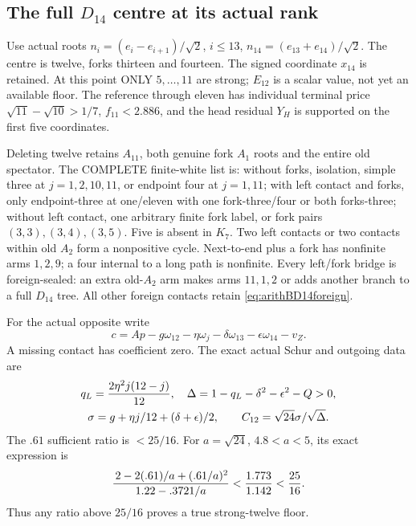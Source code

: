 \subsection{The full \(D_{14}\) centre at its actual rank}
\label{app:arithD14typedcentre}

Use actual roots
\(n_i=(e_i-e_{i+1})/\sqrt2\), \(i\le13\),
\(n_{14}=(e_{13}+e_{14})/\sqrt2\).
The centre is twelve, forks thirteen and fourteen.
The signed coordinate \(x_{14}\) is retained.
At this point ONLY \(5,\ldots,11\) are strong;
\(E_{12}\) is a scalar value, not yet an available floor.
The reference through eleven has individual terminal
price \(\sqrt{11}-\sqrt{10}>1/7\),
\(f_{11}<2.886\), and the head residual \(Y_H\)
is supported on the first five coordinates.

Deleting twelve retains \(A_{11}\), both genuine
fork \(A_1\) roots and the entire old spectator.
The COMPLETE finite-white list is:
without forks, isolation, simple three at
\(j=1,2,10,11\), or endpoint four at \(j=1,11\);
with left contact and forks, only endpoint-three
at one/eleven with one fork-three/four or both
forks-three;
without left contact, one arbitrary finite fork
label, or fork pairs \((3,3),(3,4),(3,5)\).
Five is absent in \(K_7\).
Two left contacts or two contacts within old \(A_2\)
form a nonpositive cycle.
Next-to-end plus a fork has nonfinite arms \(1,2,9\);
a four internal to a long path is nonfinite.
Every left/fork bridge is foreign-sealed:
an extra old-\(A_2\) arm makes arms \(11,1,2\)
or adds another branch to a full \(D_{14}\) tree.
All other foreign contacts retain
\eqref{eq:arithBD14foreign}.

For the actual opposite write
\[
 c=Ap-g\omega_{12}-\eta\omega_j
                   -\delta\omega_{13}-\epsilon\omega_{14}-v_Z .
\]
A missing contact has coefficient zero.
The exact actual Schur and outgoing data are
\[
 \begin{gathered}
 q_L={2\eta^2j(12-j)\over12},\quad
 \Delta=1-q_L-\delta^2-\epsilon^2-Q>0,\\
 \sigma=g+\eta j/12+(\delta+\epsilon)/2,\qquad
 C_{12}=\sqrt{24}\sigma/\sqrt\Delta .
 \end{gathered}
\]
The \(.61\) sufficient ratio is \(<25/16\).
For \(a=\sqrt{24}\), \(4.8<a<5\), its exact
expression is
\[
 {\,2-2(.61)/a+(.61/a)^2\over1.22-.3721/a}
                 <{1.773\over1.142}<{25\over16}.
\]
Thus any ratio above \(25/16\) proves a true
strong-twelve floor.

